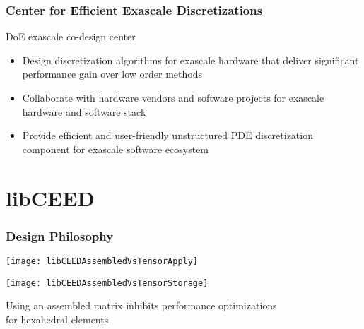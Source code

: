 \documentclass{beamer}
\begin{document}
\begin{frame}
\begin{center}
\frametitle{Center for Efficient Exascale Discretizations}

\begin{flushleft}
DoE exascale co-design center
\end{flushleft}

\begin{itemize}

\item Design discretization algorithms for exascale hardware that deliver significant performance gain over low order methods

\item Collaborate with hardware vendors and software projects for exascale hardware and software stack

\item Provide efficient and user-friendly unstructured PDE discretization component for exascale software ecosystem

\end{itemize}

\end{center}
\end{frame}

\section{libCEED}

\begin{frame}
\begin{center}
\frametitle{Design Philosophy}

\begin{multicols}{2}

\begin{flushright}
\texttt{[image: libCEEDAssembledVsTensorApply]}
\end{flushright}

\begin{flushleft}
\texttt{[image: libCEEDAssembledVsTensorStorage]}
\end{flushleft}

\end{multicols}

Using an assembled matrix inhibits performance optimizations\\
for hexahedral elements

\end{center}
\end{frame}
\end{document}
